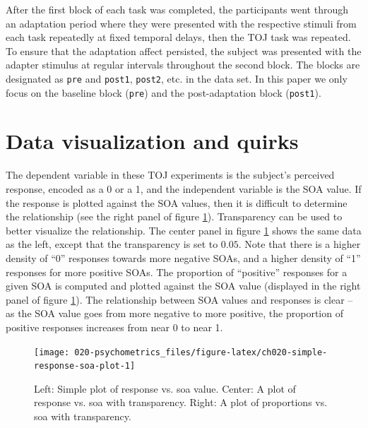 \documentclass[11pt, oneside, openany]{scrbook}
\begin{document}
After the first block of each task was completed, the participants went through an adaptation period where they were presented with the respective stimuli from each task repeatedly at fixed temporal delays, then the TOJ task was repeated. To ensure that the adaptation affect persisted, the subject was presented with the adapter stimulus at regular intervals throughout the second block. The blocks are designated as \texttt{pre} and \texttt{post1}, \texttt{post2}, etc. in the data set. In this paper we only focus on the baseline block (\texttt{pre}) and the post-adaptation block (\texttt{post1}).

\hypertarget{data-visualization-and-quirks}{%
\section{Data visualization and quirks}\label{data-visualization-and-quirks}}

The dependent variable in these TOJ experiments is the subject's perceived response, encoded as a 0 or a 1, and the independent variable is the SOA value. If the response is plotted against the SOA values, then it is difficult to determine the relationship (see the right panel of figure \ref{fig:ch020-simple-response-soa-plot}). Transparency can be used to better visualize the relationship. The center panel in figure \ref{fig:ch020-simple-response-soa-plot} shows the same data as the left, except that the transparency is set to \(0.05\). Note that there is a higher density of ``0'' responses towards more negative SOAs, and a higher density of ``1'' responses for more positive SOAs. The proportion of ``positive'' responses for a given SOA is computed and plotted against the SOA value (displayed in the right panel of figure \ref{fig:ch020-simple-response-soa-plot}). The relationship between SOA values and responses is clear -- as the SOA value goes from more negative to more positive, the proportion of positive responses increases from near 0 to near 1.

\begin{figure}

{\centering \texttt{[image: 020-psychometrics\_files/figure-latex/ch020-simple-response-soa-plot-1]} 

}

\caption{Left: Simple plot of response vs. soa value. Center: A plot of response vs. soa with transparency. Right: A plot of proportions vs. soa with transparency.}\label{fig:ch020-simple-response-soa-plot}
\end{figure}
\end{document}
